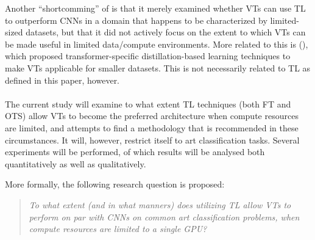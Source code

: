 Another ``shortcomming'' of \citeauthor{matsoukas2021time} is that it merely examined whether VTs can use TL to outperform CNNs in a domain that happens to be characterized by limited-sized datasets, but that it did not actively focus on the extent to which VTs can be made useful in limited data/compute environments. More related to this is \citeauthor{touvron2021training} (\citeyear{touvron2021training}), which proposed transformer-specific distillation-based learning techniques to make VTs applicable for smaller datasets. This is not necessarily related to TL as defined in this paper, however.
\\\\
The current study will examine to what extent TL techniques (both FT and OTS) allow VTs to become the preferred architecture when compute resources are limited, and attempts to find a methodology that is recommended in these circumstances. It will, however, restrict itself to art classification tasks. Several experiments will be performed, of which results will be analysed both quantitatively as well as qualitatively.


More formally, the following research question is proposed: \begin{quote}\textit{To what extent (and in what manners) does utilizing TL allow VTs to perform on par with CNNs on common art classification problems, when compute resources are limited to a single GPU?}\end{quote}
